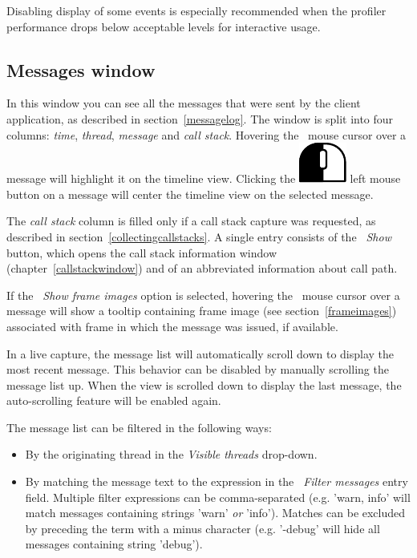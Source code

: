 \documentclass[hidelinks,titlepage,a4paper]{article}
\newcommand{\LMB}{\includegraphics[height=.8\baselineskip]{icons/lmb}}
\begin{document}
Disabling display of some events is especially recommended when the profiler performance drops below acceptable levels for interactive usage.

\subsection{Messages window}
\label{messages}

In this window you can see all the messages that were sent by the client application, as described in section~\ref{messagelog}. The window is split into four columns: \emph{time}, \emph{thread}, \emph{message} and \emph{call stack}. Hovering the \faMousePointer{}~mouse cursor over a message will highlight it on the timeline view. Clicking the \LMB{} left mouse button on a message will center the timeline view on the selected message.

The \emph{call stack} column is filled only if a call stack capture was requested, as described in section~\ref{collectingcallstacks}. A single entry consists of the \emph{\faAlignJustify{}~Show} button, which opens the call stack information window (chapter~\ref{callstackwindow}) and of an abbreviated information about call path.

If the \emph{\faImage{}~Show frame images} option is selected, hovering the \faMousePointer{}~mouse cursor over a message will show a tooltip containing frame image (see section~\ref{frameimages}) associated with frame in which the message was issued, if available.

In a live capture, the message list will automatically scroll down to display the most recent message. This behavior can be disabled by manually scrolling the message list up. When the view is scrolled down to display the last message, the auto-scrolling feature will be enabled again.

The message list can be filtered in the following ways:

\begin{itemize}
\item By the originating thread in the \emph{\faRandom{} Visible threads} drop-down.
\item By matching the message text to the expression in the \emph{\faFilter{}~Filter messages} entry field. Multiple filter expressions can be comma-separated (e.g. 'warn, info' will match messages containing strings 'warn' \emph{or} 'info'). Matches can be excluded by preceding the term with a minus character (e.g. '-debug' will hide all messages containing string 'debug').
\end{itemize}
\end{document}
